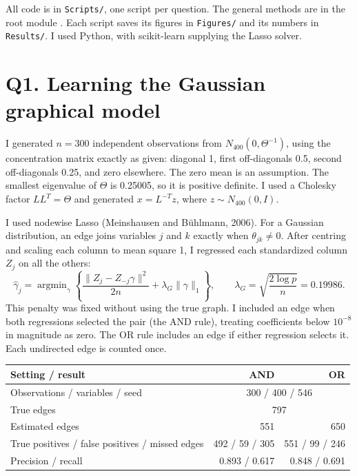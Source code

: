 \documentclass[11pt]{article}
\begin{document}
All code is in \texttt{Scripts/}, one script per question. The general methods are in the root module
. Each script saves its figures in \texttt{Figures/} and its numbers
in \texttt{Results/}. I used Python, with scikit-learn supplying the Lasso solver.

\section*{Q1. Learning the Gaussian graphical model}

I generated $n = 300$ independent observations from $N_{400}(0,\Theta^{-1})$, using the concentration
matrix exactly as given: diagonal 1, first off-diagonals 0.5, second off-diagonals 0.25, and zero elsewhere.
The zero mean is an assumption. The smallest eigenvalue of $\Theta$ is 0.25005, so it is positive definite.
I used a Cholesky factor $LL^T=\Theta$ and generated $x=L^{-T}z$, where $z\sim N_{400}(0,I)$.

I used nodewise Lasso (Meinshausen and B\"uhlmann, 2006). For a Gaussian distribution, an edge joins
variables $j$ and $k$ exactly when $\theta_{jk}\ne0$. After centring and scaling each column to mean
square 1, I regressed each standardized column $Z_j$ on all the others:
\[
\hat\gamma_j=\mathop{\arg\min}_{\gamma}
\left\{\frac{\|Z_j-Z_{-j}\gamma\|^2}{2n}+\lambda_G\|\gamma\|_1\right\},
\qquad \lambda_G=\sqrt{\frac{2\log p}{n}}=0.19986.
\]
This penalty was fixed without using the true graph. I included an edge when both regressions selected
the pair (the AND rule), treating coefficients below $10^{-8}$ in magnitude as zero. The OR rule includes
an edge if either regression selects it. Each undirected edge is counted once.

\begin{center}
\begin{tabular}{lrr}
\toprule
\textbf{Setting / result} & \textbf{AND} & \textbf{OR} \\
\midrule
Observations / variables / seed & \multicolumn{2}{c}{300 / 400 / 546} \\
True edges & \multicolumn{2}{c}{797} \\
Estimated edges & 551 & 650 \\
True positives / false positives / missed edges & 492 / 59 / 305 & 551 / 99 / 246 \\
Precision / recall & 0.893 / 0.617 & 0.848 / 0.691 \\
\bottomrule
\end{tabular}
\end{center}
\end{document}
